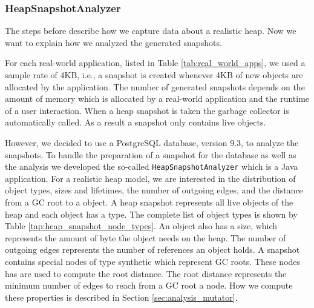 
\subsubsection{HeapSnapshotAnalyzer} \label{sec:heap_snapshot_analyzer}
The steps before describe how we capture data about a realistic \JS heap. Now we want to explain how we analyzed the generated snapshots. 

For each real-world application, listed in Table \ref{tab:real_world_apps}, we used a sample rate of 4KB, i.e., a snapshot is created whenever 4KB of new objects are allocated by the application. The number of generated snapshots depends on the amount of memory which is allocated by a real-world application and the runtime of a user interaction. When a heap snapshot is taken the garbage collector is automatically called. As a result a snapshot only contains live objects. 

However, we decided to use a PostgreSQL \cite{PSQL} database, version 9.3, to analyze the snapshots. To handle the preparation of a snapshot for the database as well as the analysis we developed the so-called \texttt{HeapSnapshotAnalyzer} which is a Java application. For a realistic heap model, we are interested in the distribution of object types, sizes and lifetimes, the number of outgoing edges, and the distance from a GC root to a object. A heap snapshot represents all live objects of the \JS heap and each object has a type. The complete list of object types is shown by Table \ref{tap:heap_snapshot_node_types}. An object also has a size, which represents the amount of byte the object needs on the heap. The number of outgoing edges represents the number of references an object holds. A snapshot contains special nodes of type synthetic which represent GC roots. These nodes has are used to compute the root distance. The root distance represents the minimum number of edges to reach from a GC root a node. How we compute these properties is described in Section \ref{sec:analysis_mutator}.